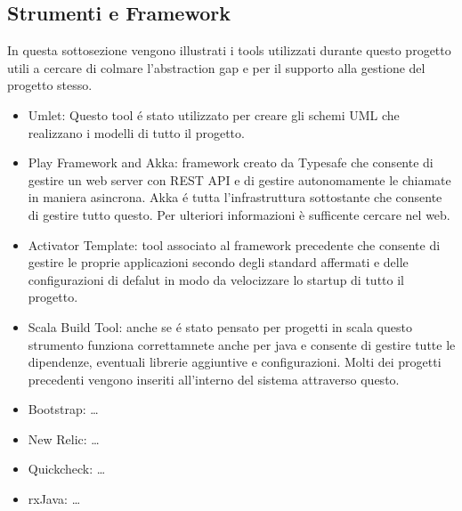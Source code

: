 \subsection{Strumenti e Framework}

In questa sottosezione vengono illustrati i tools utilizzati durante questo progetto utili a cercare di colmare l'abstraction gap e per il supporto alla gestione del progetto stesso.

\begin{itemize}
 \item{Umlet:} Questo tool \'e stato utilizzato per creare gli schemi UML che realizzano i modelli di tutto il progetto.
 \item {Play Framework and Akka:} framework creato da Typesafe che consente di gestire un web server con REST API e di gestire autonomamente le chiamate in maniera asincrona. Akka \'e tutta l'infrastruttura sottostante che consente di gestire tutto questo. Per ulteriori informazioni è sufficente cercare nel web.
 \item {Activator Template:} tool associato al framework precedente che consente di gestire le proprie applicazioni secondo degli standard affermati e delle configurazioni di defalut in modo da velocizzare lo startup di tutto il progetto.
 \item {Scala Build Tool:} anche se \'e stato pensato per progetti in scala questo strumento funziona correttamnete anche per java e consente di gestire tutte le dipendenze, eventuali librerie aggiuntive e configurazioni. Molti dei progetti precedenti vengono inseriti all'interno del sistema attraverso questo.
 \item {Bootstrap:} \ldots  
 \item {New Relic:} \ldots
 \item {Quickcheck:} \ldots
 \item {rxJava:} \ldots
\end{itemize}
